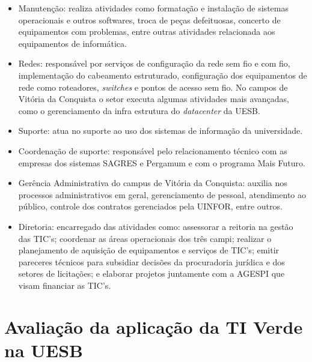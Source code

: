 \begin{itemize}
    \item Manutenção: realiza atividades como formatação e instalação de sistemas operacionais e outros softwares, troca de peças defeituosas, concerto de equipamentos com problemas, entre outras atividades relacionada aos equipamentos de informática.
    \item Redes: responsável por serviços de configuração da rede sem fio e com fio, implementação do cabeamento estruturado, configuração dos equipamentos de rede como roteadores, \textit{switches} e pontos de acesso sem fio. No campos de Vitória da Conquista o setor executa algumas atividades mais avançadas, como o gerenciamento da infra estrutura do \textit{datacenter} da UESB. 
    \item Suporte: atua no suporte ao uso dos sistemas de informação da universidade.
    \item Coordenação de suporte: responsável pelo relacionamento técnico com as empresas dos sistemas SAGRES e Pergamum e com o programa Mais Futuro.
    \item Gerência Administrativa do campus de Vitória da Conquista: auxilia nos processos administrativos em geral, gerenciamento de pessoal, atendimento ao público, controle dos contratos gerenciados pela UINFOR, entre outros.
    \item Diretoria: encarregado das atividades como: assessorar a reitoria na gestão das TIC's; coordenar as áreas operacionais dos três campi; realizar o planejamento de aquisição de equipamentos e serviços de TIC's; emitir pareceres técnicos para subsidiar decisões da procuradoria jurídica e dos setores de licitações; e elaborar projetos juntamente com a AGESPI que visam financiar as TIC's.
\end{itemize}

\section{Avaliação da aplicação da TI Verde na UESB}

